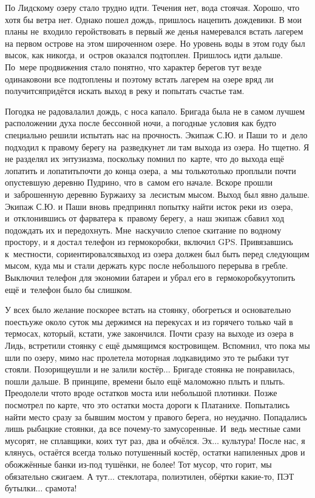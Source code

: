 По Лидскому озеру стало трудно идти. Течения нет, вода стоячая. Хорошо, что хотя бы ветра нет. Однако пошел дождь, пришлось нацепить дождевики. В мои планы не~входило геройствовать в первый же день\mdash я намеревался встать лагерем на первом острове на этом широченном озере. Но уровень воды в этом году был высок, как никогда, и~остров оказался подтоплен. Пришлось идти дальше. По~мере продвижения стало понятно, что характер берегов тут везде одинаков\mdash они все подтоплены и поэтому встать лагерем на озере вряд ли получится\mdash придётся искать выход в реку и попытать счастье там. 

Погодка не радовала\mdash лил дождь, с носа капало. Бригада была не в самом лучшем расположении духа после бессонной ночи, а погодные условия как будто специально решили испытать нас на прочность. Экипаж С.Ю. и Паши то~и~дело подходил к правому берегу на~разведку\mdash нет ли там выхода из озера. Но тщетно. Я не разделял их энтузиазма, поскольку помнил по~карте, что до выхода ещё лопатить и лопатить\mdash почти до конца озера, а~мы только\sdash только проплыли почти опустевшую деревню Пудрино, что в~самом его начале. Вскоре прошли и~заброшенную деревню Буржаиху за~лесистым мысом. Выход был явно дальше. Экипаж С.Ю. и Паши вновь предпринял попытку найти исток реки из~озера, и~отклонившись от фарватера к~правому берегу, а~наш экипаж сбавил ход подождать их и передохнуть. Мне~наскучило слепое скитание по водному простору, и я достал телефон из гермокоробки, включил GPS. Привязавшись к~местности, сориентировался\mdash выход из озера должен был быть перед следующим мысом, куда мы и стали держать курс после небольшого перерыва в гребле. Выключил телефон для экономии батареи и убрал его в~гермокоробку\mdash утопить ещё и~телефон было бы слишком.

У всех было желание поскорее встать на стоянку, обогреться и основательно поесть\mdash уже около суток мы держимся на перекусах и из горячего только чай в термосах, который, кстати, уже закончился. Почти сразу на выходе из озера в Лидь, встретили стоянку с ещё дымящимся костровищем. Вспомнил, что пока мы шли по озеру, мимо нас пролетела моторная лодка\mdash видимо это те рыбаки тут стояли. Позорище\mdash ушли и не залили костёр$\ldots$ Бригаде стоянка не понравилась, пошли дальше. В принципе, времени было ещё мало\mdash можно плыть и плыть. Преодолели что\sdash то вроде остатков моста или небольшой плотинки. Позже посмотрел по карте, что это остатки моста дороги к Платанихе. Попытались найти место сразу за бывшим мостом у правого берега, но неудачно. Попадались лишь рыбацкие стоянки, да все почему-то замусоренные. И~ведь местные сами мусорят, не сплавщики, коих тут раз, два и обчёлся. Эх$\ldots$ культура! После нас, я клянусь, остаётся всегда только потушенный костёр, остатки напиленных дров и обожжённые банки из-под тушёнки, не более! Тот мусор, что горит, мы обязательно сжигаем. А тут$\ldots$ стеклотара, полиэтилен, обёртки какие-то, ПЭТ бутылки$\ldots$ срамота! 

